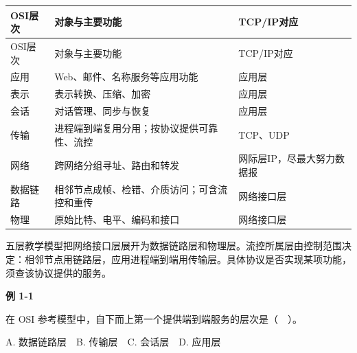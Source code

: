 \par\smallskip
\begin{wideblock}
{\fontsize{9.3}{12}\selectfont\setlength{\tabcolsep}{2.5pt}\setlength{\LTleft}{0pt}\setlength{\LTright}{0pt}
\begin{longtable}{@{}>{\raggedright\arraybackslash}p{}>{\raggedright\arraybackslash}p{}>{\raggedright\arraybackslash}p{}@{}}
\toprule
OSI层次 & 对象与主要功能 & TCP/IP对应 \\

\midrule\endfirsthead\toprule
OSI层次 & 对象与主要功能 & TCP/IP对应 \\

\midrule\endhead\bottomrule\endfoot
应用 & Web、邮件、名称服务等应用功能 & 应用层 \\

表示 & 表示转换、压缩、加密 & 应用层 \\

会话 & 对话管理、同步与恢复 & 应用层 \\

传输 & 进程端到端复用分用；按协议提供可靠性、流控 & TCP、UDP \\

网络 & 跨网络分组寻址、路由和转发 & 网际层IP，尽最大努力数据报 \\

数据链路 & 相邻节点成帧、检错、介质访问；可含流控和重传 & 网络接口层 \\

物理 & 原始比特、电平、编码和接口 & 网络接口层 \\

\end{longtable}}
\end{wideblock}
\par\smallskip

五层教学模型把网络接口层展开为数据链路层和物理层。流控所属层由控制范围决定：相邻节点用链路层，应用进程端到端用传输层。具体协议是否实现某项功能，须查该协议提供的服务。

\par\medskip{}\noindent\hypertarget{CN01-E01}{}\label{CN01-E01}\textbf{例 1-1}\par\nobreak\smallskip

在 OSI 参考模型中，自下而上第一个提供端到端服务的层次是（　）。

A. 数据链路层　B. 传输层　C. 会话层　D. 应用层

